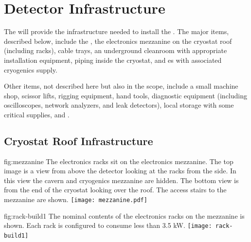 \section{Detector Infrastructure}
\label{sec:fdsp-tc-infr}


The   will provide the infrastructure needed to install the . The major items, described below, include the , the electronics mezzanine on the cryostat roof (including racks), cable trays, an underground cleanroom with appropriate installation equipment, piping inside the cryostat, and \coldbox{}es with associated cryogenics supply. 

Other items, not described here but also in the  scope, include a small machine shop, scissor lifts, rigging equipment, hand tools, diagnostic equipment (including oscilloscopes, network analyzers, and leak detectors), local storage with some critical supplies, and .  



\subsection{Cryostat Roof Infrastructure}
\label{sec:fdsp-tc-infr-cryo-roof}

\begin{dunefigure}{fig:mezzanine}
  {The electronics racks sit on the  electronics mezzanine. The top image is a view from above the detector looking at the racks from the side. In this view the cavern and cryogenics mezzanine are hidden. The bottom view is from the end of the cryostat looking over the roof. The access stairs to the mezzanine are shown.}
 \texttt{[image: mezzanine.pdf]}
\end{dunefigure}

\begin{dunefigure}{fig:rack-build1}
  {The nominal contents of the electronics racks on the mezzanine is shown. Each rack is configured to consume less than 3.5 \si{kW}. 
  }
 \texttt{[image: rack-build1]} 
\end{dunefigure}

